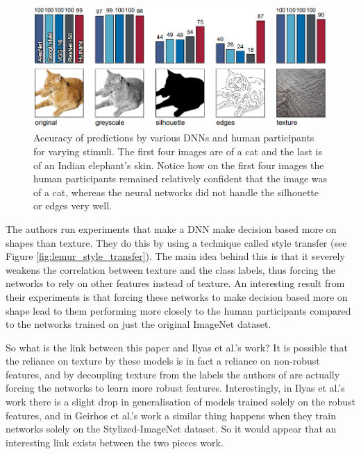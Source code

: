 \documentclass{article}
\begin{document}
\begin{figure}
    \centering
    \includegraphics[width=\linewidth]{figures/cat-shape.png}
    \caption{Accuracy of predictions by various DNNs and human participants for varying stimuli. The first four images are of a cat and the last is of an Indian elephant's skin. Notice how on the first four images the human participants remained relatively confident that the image was of a cat, whereas the neural networks did not handle the silhouette or edges very well.\protect\footnotemark}
    \label{fig:cat_shapes}
\end{figure}

The authors run experiments that make a DNN make decision based more on shapes than texture. They do this by using a technique called style transfer (see Figure \ref{fig:lemur_style_transfer}). The main idea behind this is that it severely weakens the correlation between texture and the class labels, thus forcing the networks to rely on other features instead of texture. An interesting result from their experiments is that forcing these networks to make decision based more on shape lead to them performing more closely to the human participants compared to the networks trained on just the original ImageNet dataset. 

So what is the link between this paper and Ilyas et al.'s work? It is possible that the reliance on texture by these models is in fact a reliance on non-robust features, and by decoupling texture from the labels the authors of \cite{geirhos2018imagenet} are actually forcing the networks to learn more robust features. Interestingly, in Ilyas et al.'s work there is a slight drop in generalisation of models trained solely on the robust features, and in Geirhos et al.'s work a similar thing happens when they train networks solely on the Stylized-ImageNet dataset. So it would appear that an interesting link exists between the two pieces work.
\end{document}
